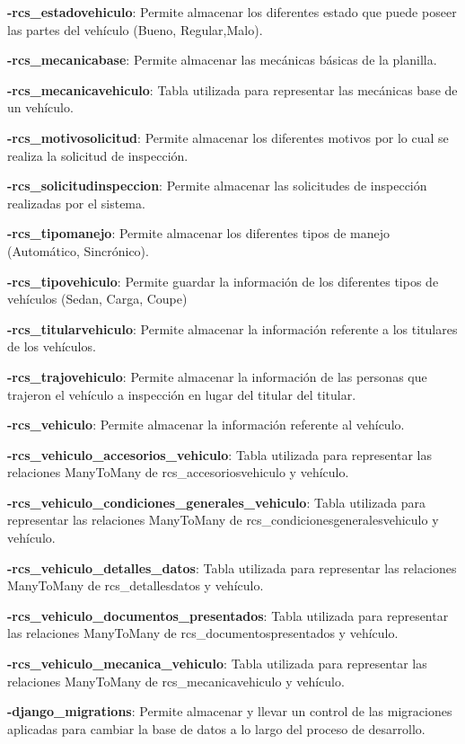 \textbf{-rcs\_estadovehiculo}: Permite almacenar los diferentes estado que puede poseer las partes del vehículo (Bueno, Regular,Malo).

\textbf{-rcs\_mecanicabase}: Permite almacenar las mecánicas básicas de la planilla.

\textbf{-rcs\_mecanicavehiculo}: Tabla utilizada para representar las mecánicas base de un vehículo.

\textbf{-rcs\_motivosolicitud}: Permite almacenar los diferentes motivos por lo cual se realiza la solicitud de inspección.

\textbf{-rcs\_solicitudinspeccion}: Permite almacenar las solicitudes de inspección realizadas por el sistema.

\textbf{-rcs\_tipomanejo}: Permite almacenar los diferentes tipos de manejo (Automático, Sincrónico).

\textbf{-rcs\_tipovehiculo}: Permite guardar la información de los diferentes tipos de vehículos (Sedan, Carga, Coupe)

\textbf{-rcs\_titularvehiculo}: Permite almacenar la información referente a los titulares de los vehículos.

\textbf{-rcs\_trajovehiculo}: Permite almacenar la información de las personas que trajeron el vehículo a inspección en lugar del titular del titular.

\textbf{-rcs\_vehiculo}: Permite almacenar la información referente al vehículo.

\textbf{-rcs\_vehiculo\_accesorios\_vehiculo}: Tabla utilizada para representar las relaciones ManyToMany de rcs\_accesoriosvehiculo y vehículo.

\textbf{-rcs\_vehiculo\_condiciones\_generales\_vehiculo}: Tabla utilizada para representar las relaciones ManyToMany de rcs\_condicionesgeneralesvehiculo y vehículo.

\textbf{-rcs\_vehiculo\_detalles\_datos}: Tabla utilizada para representar las relaciones ManyToMany de rcs\_detallesdatos y vehículo.

\textbf{-rcs\_vehiculo\_documentos\_presentados}: Tabla utilizada para representar las relaciones ManyToMany de rcs\_documentospresentados y vehículo.

\textbf{-rcs\_vehiculo\_mecanica\_vehiculo}: Tabla utilizada para representar las relaciones ManyToMany de rcs\_mecanicavehiculo y vehículo.

\textbf{-django\_migrations}: Permite almacenar y llevar un control de las migraciones aplicadas para cambiar la base de datos a lo largo del proceso de desarrollo.

